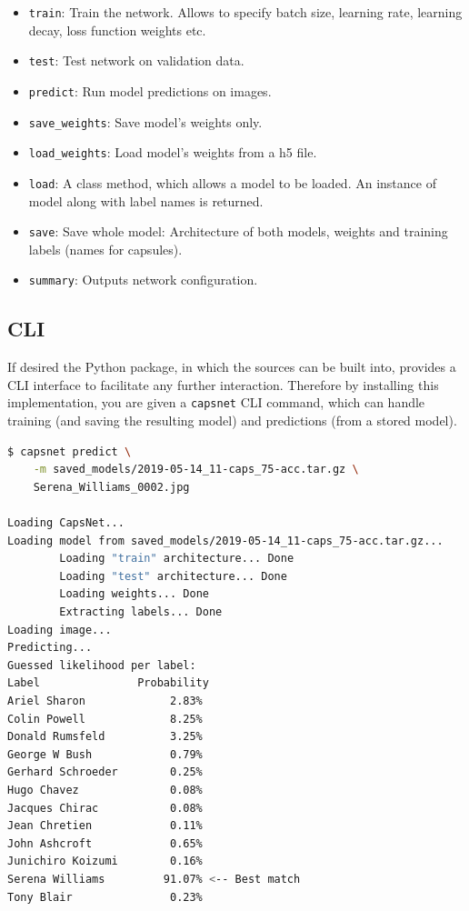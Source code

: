\begin{itemize}
    \item \texttt{train}: Train the network. Allows to specify batch size, learning rate, learning decay, loss function weights etc.
    \item \texttt{test}: Test network on validation data.
    \item \texttt{predict}: Run model predictions on images.
    \item \texttt{save\_weights}: Save model's weights only.
    \item \texttt{load\_weights}: Load model's weights from a h5 file.
    \item \texttt{load}: A class method, which allows a model to be loaded. An instance of model along with label names is returned.
    \item \texttt{save}: Save whole model: Architecture of both models, weights and training labels (names for capsules).
    \item \texttt{summary}: Outputs network configuration.
\end{itemize}

\subsection{CLI}

If desired the Python package, in which the sources can be built into, provides a CLI interface to facilitate any further interaction. Therefore by installing this implementation, you are given a \texttt{capsnet} CLI command, which can handle training (and saving the resulting model) and predictions (from a stored model).

\begin{lstlisting}[language=Bash, caption=CLI interface for predictions.]
$ capsnet predict \
    -m saved_models/2019-05-14_11-caps_75-acc.tar.gz \
    Serena_Williams_0002.jpg

Loading CapsNet...
Loading model from saved_models/2019-05-14_11-caps_75-acc.tar.gz...
        Loading "train" architecture... Done
        Loading "test" architecture... Done
        Loading weights... Done
        Extracting labels... Done
Loading image...
Predicting...
Guessed likelihood per label:
Label               Probability
Ariel Sharon             2.83%
Colin Powell             8.25%
Donald Rumsfeld          3.25%
George W Bush            0.79%
Gerhard Schroeder        0.25%
Hugo Chavez              0.08%
Jacques Chirac           0.08%
Jean Chretien            0.11%
John Ashcroft            0.65%
Junichiro Koizumi        0.16%
Serena Williams         91.07% <-- Best match
Tony Blair               0.23%
\end{lstlisting}

